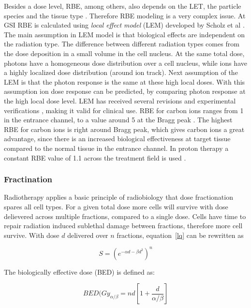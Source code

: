 \documentclass[type=dr, dr=rernat, accentcolor=tud7b,colorbacktitle, bigchapter, openright, twoside, 12pt ]{tudthesis}
\begin{document}
Besides a dose level, RBE, among others, also depends on the LET, the particle species and the tissue type \cite{Kraft2000}. Therefore RBE modeling is a very complex issue.
At GSI RBE is calculated using \textit{local effect model} (LEM) developed by Scholz et al \cite{Scholz1994}. The main assumption in LEM model is that biological 
effects are independent on the radiation type. The difference between different radiation types comes from the dose deposition in a small volume in the cell nucleus.
At the same total dose, photons have a homogeneous dose distribution over a cell nucleus, while ions have a highly localized dose distribution (around ion track).
Next assumption of the LEM is that the photon response is the same at these high local doses. With this assumption ion dose response can be predicted, by comparing
photon response at the high local dose level. LEM has received several revisions \cite{Elsaesser2006, Elsaesser2007, Elsaesser2009} and experimental verifications
\cite{Mitaroff1998, Kraemer2000a, Kraemer2003}, making it valid for clinical use. RBE for carbon ions ranges from 1 in the entrance channel, to a value around 5 at 
the Bragg peak \cite{Kraft2000}. The highest RBE for carbon ions is right around Bragg peak, which gives carbon ions a great advantage, since there is an increased 
biological effectiveness at target tissue compared to the normal tissue in the entrance channel. In proton therapy a constant RBE value of 1.1 across the treatment field
is used \cite{Paganetti2002}.

\subsubsection{Fractination}

Radiotherapy applies a basic principle of radiobiology that dose fractionation spares all cell types. For a given total dose
more cells will survive with dose delievered across multiple fractions, compared to a single dose. Cells have time to repair
radiation induced sublethal damage between fractions, therefore more cell survive.
With dose $d$ delivered over $n$ fractions, equation~\ref{lq} can be rewritten as \cite{Shrieve2011}

\begin{equation}
 S = (e^{-\alpha d - \beta d^2})^n
\end{equation}

The biologically effective dose (BED) is defined as:

\begin{equation}
 BED(Gy_{\alpha/\beta}=nd\left[1 + \frac{d}{\alpha/\beta} \right]
\end{equation}
\end{document}
